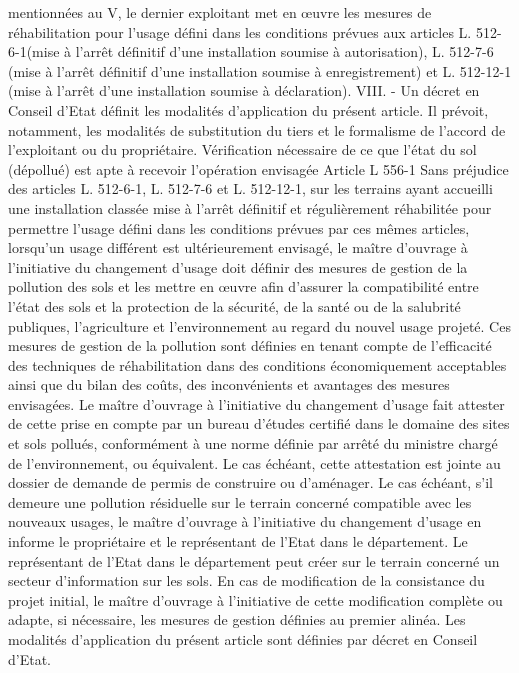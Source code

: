 \documentclass[11pt,a4paper]{report}
\begin{document}
	mentionnées au V, le dernier exploitant met en œuvre les mesures de réhabilitation pour l'usage défini dans les
	conditions prévues aux articles L. 512-6-1(mise à l’arrêt définitif d’une installation soumise à autorisation), L.
	512-7-6 (mise à l’arrêt définitif d’une installation soumise à enregistrement) et L. 512-12-1 (mise à l’arrêt d’une
	installation soumise à déclaration).
	VIII. - Un décret en Conseil d'Etat définit les modalités d'application du présent article. Il prévoit, notamment,
	les modalités de substitution du tiers et le formalisme de l'accord de l'exploitant ou du propriétaire.
	Vérification nécessaire de ce que l’état du sol (dépollué) est apte à recevoir l’opération envisagée
	Article L 556-1
	Sans préjudice des articles L. 512-6-1, L. 512-7-6 et L. 512-12-1, sur les terrains ayant accueilli une installation
	classée mise à l'arrêt définitif et régulièrement réhabilitée pour permettre l'usage défini dans les conditions
	prévues par ces mêmes articles, lorsqu'un usage différent est ultérieurement envisagé, le maître d'ouvrage à
	l'initiative du changement d'usage doit définir des mesures de gestion de la pollution des sols et les mettre en
	œuvre afin d'assurer la compatibilité entre l'état des sols et la protection de la sécurité, de la santé ou de la
	salubrité publiques, l'agriculture et l'environnement au regard du nouvel usage projeté.
	Ces mesures de gestion de la pollution sont définies en tenant compte de l'efficacité des techniques de
	réhabilitation dans des conditions économiquement acceptables ainsi que du bilan des coûts, des inconvénients
	et avantages des mesures envisagées. Le maître d'ouvrage à l'initiative du changement d'usage fait attester de
	cette prise en compte par un bureau d'études certifié dans le domaine des sites et sols pollués, conformément à
	une norme définie par arrêté du ministre chargé de l'environnement, ou équivalent. Le cas échéant, cette
	attestation est jointe au dossier de demande de permis de construire ou d'aménager.
	Le cas échéant, s'il demeure une pollution résiduelle sur le terrain concerné compatible avec les nouveaux
	usages, le maître d'ouvrage à l'initiative du changement d'usage en informe le propriétaire et le représentant de
	l'Etat dans le département. Le représentant de l'Etat dans le département peut créer sur le terrain concerné un
	secteur d'information sur les sols.
	En cas de modification de la consistance du projet initial, le maître d'ouvrage à l'initiative de cette modification
	complète ou adapte, si nécessaire, les mesures de gestion définies au premier alinéa.
	Les modalités d'application du présent article sont définies par décret en Conseil d'Etat.
\end{document}
